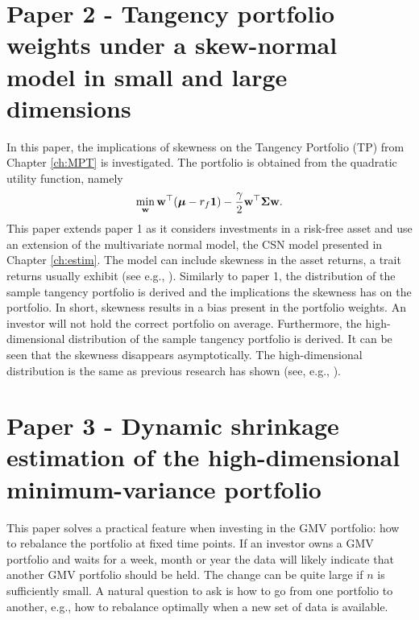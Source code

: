 \documentclass[12pt, oneside]{book}\usepackage{knitr}
\begin{document}
\section{Paper 2 - Tangency portfolio weights under a skew-normal model in small and large dimensions}\label{sec:paper2}
In this paper, the implications of skewness on the Tangency Portfolio (TP) from Chapter \ref{ch:MPT} is investigated. 
The portfolio is obtained from the quadratic utility function, namely
\begin{equation}
  \min_{\mathbf{w}} \mathbf{w}^\top (\mbox{\boldmath$\mu$} -r_f\mathbf{1}) - \frac{\gamma}{2} \mathbf{w}^\top \mathbf{\Sigma} \mathbf{w}.
\end{equation}
This paper extends paper 1 as it considers investments in a risk-free asset and use an extension of the multivariate normal model, the CSN model presented in Chapter \ref{ch:estim}. 
The model can include skewness in the asset returns, a trait returns usually exhibit (see e.g., \citet{cont2001empirical}). 
Similarly to paper 1, the distribution of the sample tangency portfolio is derived and the implications the skewness has on the portfolio.
In short, skewness results in a bias present in the portfolio weights. 
An investor will not hold the correct portfolio on average.
Furthermore, the high-dimensional distribution of the sample tangency portfolio is derived.
It can be seen that the skewness disappears asymptotically. 
The high-dimensional distribution is the same as previous research has shown (see, e.g., \citet{karlsson2021statistical}).

\section{Paper 3 - Dynamic shrinkage estimation of the high-dimensional minimum-variance portfolio}\label{sec:paper3}
This paper solves a practical feature when investing in the GMV portfolio: how to rebalance the portfolio at fixed time points. 
If an investor owns a GMV portfolio and waits for a week, month or year the data will likely indicate that another GMV portfolio should be held.
The change can be quite large if $n$ is sufficiently small.
A natural question to ask is how to go from one portfolio to another, e.g., how to rebalance optimally when a new set of data is available. 
\end{document}
